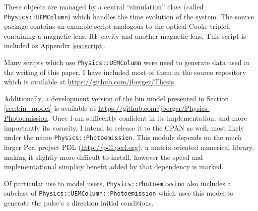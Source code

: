 These objects are managed by a central ``simulation'' class (called \verb!Physics::UEMColumn!) which handles the time evolution of the system.
The source package contains an example script analogous to the optical Cooke triplet, containing a magnetic lens, RF cavity and another magnetic lens.
This script is included as Appendix \ref{sec:script}.

Many scripts which use \verb!Physics::UEMColumn! were need to generate data used in the writing of this paper.
I have included most of them in the source repository which is available at \url{https://github.com/jberger/Thesis}.

Additionally, a development version of the bin model presented in Section \ref{sec:bin_model} is available at \url{https://github.com/jberger/Physics-Photoemission}.
Once I am sufficently confident in its implementation, and more importantly its voracity, I intend to release it to the CPAN as well, most likely under the name \verb!Physics::Photoemission!.
This module depends on the much larger Perl project PDL (\url{http://pdl.perl.org}), a matrix-oriented numerical library, making it slightly more difficult to install, however the speed and implementational simplicy benefit added by that dependency is marked.

Of particular use to model users, \verb!Physics::Photoemission! also includes a subclass of \verb!Physics::UEMColumn::Photoemission! which uses this model to generate the pulse's $z$ direction initial conditions.

